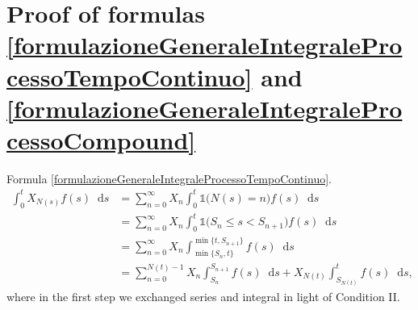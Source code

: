 \documentclass[12pt, twoside, english, headsepline]{article}
\newcommand*\dif{\mathop{}\!\mathrm{d}}  %
\theoremstyle{definition} %
\numberwithin{equation}{section} %
\begin{document}



%




 \appendix

 
 \section{Proof of formulas \eqref{formulazioneGeneraleIntegraleProcessoTempoContinuo} and \eqref{formulazioneGeneraleIntegraleProcessoCompound}}\label{appendiceCalcoloEsplicitoIntegrali}
 Formula \eqref{formulazioneGeneraleIntegraleProcessoTempoContinuo}.
\begin{align*}
	\int_0^t X_{N(s)} f(s)\dif s &=  \sum_{n=0}^\infty  X_n \int_{0}^t \mathds{1}\big(N(s) =n\big) f(s)\dif s \\
	&= \sum_{n=0}^\infty  X_n \int_{0}^t \mathds{1}\big(S_n \le s < S_{n+1}\big) f(s)\dif s \\
	&= \sum_{n=0}^\infty  X_n \int_{\min\{S_n, t\}}^{\min\{t, S_{n+1}\}} f(s)\dif s \\
	&= \sum_{n=0}^{N(t)-1}  X_n \int_{S_n}^{S_{n+1}} f(s)\dif s + X_{N(t)} \int_{S_{N(t)}}^t f(s)\dif s,
\end{align*}
where in the first step we exchanged series and integral in light of Condition II.
\end{document}
